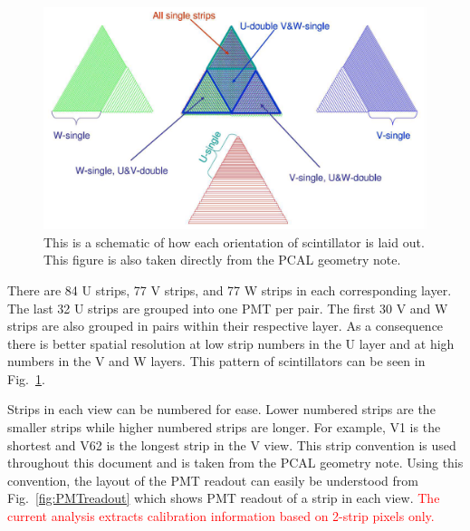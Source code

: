 \begin{figure}[h]
    \centering
    \includegraphics[width= 5in, keepaspectratio = true]{Pcal_geom_fig5}
    \caption{This is a schematic of how each orientation of scintillator is laid out. This figure is also taken directly from
     the PCAL geometry note\cite{bib:geomnote}.}
    \label{fig:geomfig5}
\end{figure}
\FloatBarrier

\FloatBarrier
There are 84 U strips, 77 V strips, and 77 W strips in each corresponding layer. The last 32 U strips are grouped into one PMT
per pair. The first 30 V and W strips are also grouped in pairs within their respective layer. As a consequence 
there is better spatial resolution at low strip numbers in the U layer and at high numbers in the V and W layers. This pattern 
of scintillators can be seen in Fig.~\ref{fig:geomfig5}.

Strips in each view can be numbered for ease. Lower numbered strips are the smaller strips while higher numbered strips are longer.
For example, V1 is the shortest and V62 is the longest strip in the V view. This strip convention is used throughout this
document and is taken from the PCAL geometry note\cite{bib:geomnote}. Using this convention, the layout of the PMT readout 
can easily be understood from Fig.~\ref{fig:PMTreadout} which shows PMT readout of a strip in each view. \textcolor{red}{The 
current analysis extracts calibration information based on 2-strip pixels only.}

